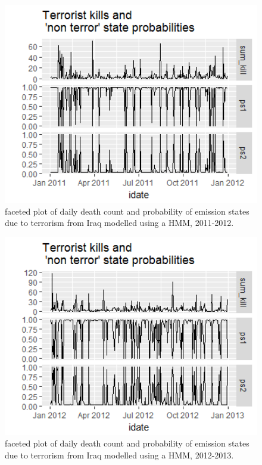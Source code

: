 \begin{figure}[t]
\includegraphics[width=15cm]{Peters_experiment_markdown_files/figure-latex/Rplot02_2011_2012.png}
\caption{faceted plot of daily death count and probability of emission states due to terrorism from Iraq modelled using a HMM, 2011-2012.}
\label{fig:Rplot02_2011_2012}
\centering
\end{figure}

\begin{figure}[t]
\includegraphics[width=15cm]{Peters_experiment_markdown_files/figure-latex/Rplot02_2012_2013_HMM.png}
\caption{faceted plot of daily death count and probability of emission states due to terrorism from Iraq modelled using a HMM, 2012-2013.}
\label{fig:Rplot02_2012_2013_HMM}
\centering
\end{figure}


